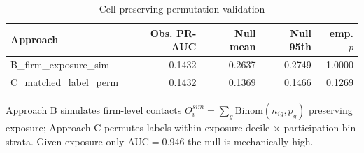 \begin{table}[htbp]\centering
\caption{Cell-preserving permutation validation}
\label{tab:opp_permutation}
\begin{tabular}{lrrrr}\hline
Approach & Obs. PR-AUC & Null mean & Null 95th & emp. $p$ \\\hline
B\_firm\_exposure\_sim & 0.1432 & 0.2637 & 0.2749 & 1.0000 \\
C\_matched\_label\_perm & 0.1432 & 0.1369 & 0.1466 & 0.1269 \\
\hline\end{tabular}
\begin{tablenotes}\footnotesize\item Approach B simulates firm-level contacts $O_i^{sim}=\sum_g \text{Binom}(n_{ig},p_g)$ preserving exposure; Approach C permutes labels within exposure-decile $\times$ participation-bin strata. Given exposure-only AUC$=0.946$ the null is mechanically high.\end{tablenotes}
\end{table}
